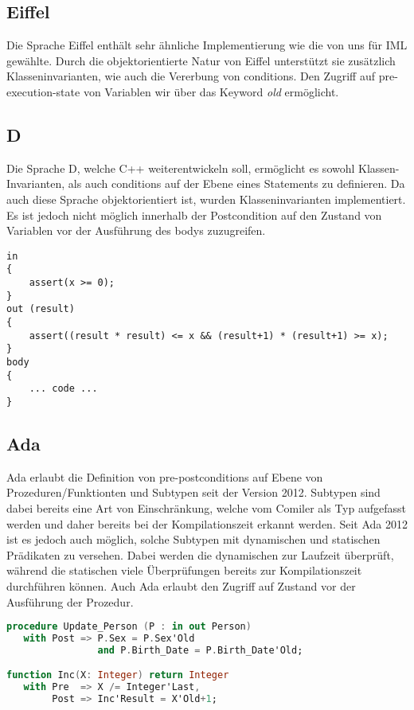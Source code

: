 \subsection{Eiffel}
Die Sprache Eiffel enthält sehr ähnliche Implementierung wie die von uns für IML gewählte. Durch
die objektorientierte Natur von Eiffel unterstützt sie zusätzlich Klasseninvarianten, wie auch die
Vererbung von conditions. Den Zugriff auf pre-execution-state von Variablen wir über das 
Keyword \textit{old} ermöglicht.

\subsection{D}
Die Sprache D\cite{D:Main}, welche C++ weiterentwickeln soll, ermöglicht es sowohl Klassen-Invarianten,
als auch conditions auf der Ebene eines Statements zu definieren. Da auch diese Sprache objektorientiert 
ist, wurden Klasseninvarianten implementiert. Es ist jedoch nicht möglich innerhalb der Postcondition 
auf den Zustand von Variablen vor der Ausführung des bodys zuzugreifen.\newline

\begin{lstlisting}[caption=Beispiel in D]
in 
{ 
    assert(x >= 0);
} 
out (result) 
{
    assert((result * result) <= x && (result+1) * (result+1) >= x);
} 
body
{
    ... code ...
}
\end{lstlisting}

\subsection{Ada}
Ada erlaubt die Definition von pre-postconditions auf Ebene von Prozeduren/Funktionten und Subtypen 
seit der Version 2012. Subtypen sind
dabei bereits eine Art von Einschränkung, welche vom Comiler als Typ aufgefasst werden und daher bereits
bei der Kompilationszeit erkannt werden. Seit Ada 2012 ist es jedoch auch möglich, solche Subtypen 
mit dynamischen und statischen Prädikaten zu versehen. Dabei werden die dynamischen zur Laufzeit 
überprüft, während die statischen viele Überprüfungen bereits zur Kompilationszeit
 durchführen können. Auch 
Ada erlaubt den Zugriff auf Zustand vor der Ausführung der Prozedur. \newline

\begin{lstlisting}[caption=Beispiel in Ada 2012,language=Ada]
procedure Update_Person (P : in out Person)
   with Post => P.Sex = P.Sex'Old 
                and P.Birth_Date = P.Birth_Date'Old;

function Inc(X: Integer) return Integer
   with Pre  => X /= Integer'Last,
        Post => Inc'Result = X'Old+1;
\end{lstlisting}
